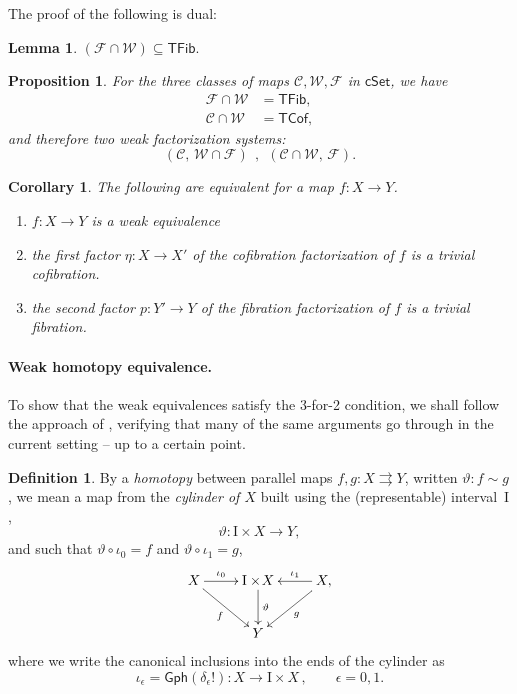 \documentclass[12pt]{article}
\newcommand{\cSet}{\ensuremath{\mathsf{cSet}}}
\newcommand{\ra}{\ensuremath{\rightarrow}}
\renewcommand{\to}{\ensuremath{\rightarrow}}
\newcommand{\I}{\ensuremath{\mathrm{I}}}
\newtheorem{proposition}[theorem]{Proposition}
\newtheorem{lemma}[theorem]{Lemma}
\newtheorem{corollary}[theorem]{Corollary}
\theoremstyle{remark}
\theoremstyle{definition}
\newtheorem{definition}[theorem]{Definition}
\begin{document}
The proof of the following is dual:
\begin{lemma}
$(\mathcal{F} \cap \mathcal{W})  \subseteq \mathsf{TFib}.$
\end{lemma}

\begin{proposition}\label{prop:FWC}
For the three classes of maps $\mathcal{C}, \mathcal{W}, \mathcal{F}$ in \cSet, we have 
\begin{align*}
\mathcal{F}\cap\mathcal{W} &= \mathsf{TFib}, \\
\mathcal{C}\cap\mathcal{W} &= \mathsf{TCof},
\end{align*}
and therefore two weak factorization systems:
\[
(\mathcal{C},\, \mathcal{W}\cap\mathcal{F})\ \ ,\ \ (\mathcal{C}\cap\mathcal{W},\, \mathcal{F}).
\]
\end{proposition}

\begin{corollary}
The following are equivalent for a map $f: X\ra Y$.
\begin{enumerate}
\item $f:X\to Y$ is a weak equivalence
\item the first factor $\eta  : X \to X'$ of the cofibration factorization of $f$ is a trivial cofibration.
\item the second factor $p : Y' \to Y$ of the fibration factorization of $f$ is a trivial fibration.
\end{enumerate}
\end{corollary}

\paragraph{Weak homotopy equivalence.}

To show that the weak equivalences satisfy the 3-for-2 condition, we shall follow the approach of \cite{Joyal}, verifying that many of the same arguments go through in the current setting -- up to a certain point.

\begin{definition}\label{homotopy}
By a \emph{homotopy} between parallel maps $f, g: X\rightrightarrows Y$, written $\vartheta : f \sim g$,  we  mean a map from the \emph{cylinder of $X$} built using the (representable) interval~$\I$,
\[
\vartheta : \I\times{X} \ra Y,
\]
and such that $\vartheta \circ \iota_0 = f$ and $\vartheta \circ \iota_1 = g$, 
\begin{equation*}%
\xymatrix{
X \ar[r]^-{\iota_0} \ar[rd]_f & \I\times\!{X} \ar[d]^-{\vartheta} & X, \ar[l]_-{\iota_1} \ar[ld]^g \\
& Y &
}
\end{equation*}
where we write the canonical inclusions into the ends of the cylinder as
\[
\iota_\epsilon = \mathsf{Gph}(\delta_\epsilon!) : X\ra \I\times X\,,\qquad \epsilon = 0,1 .
\]  
\end{definition}
\end{document}
